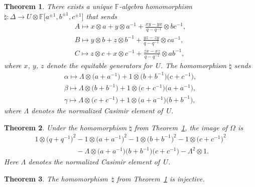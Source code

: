 \documentclass[pdftex]{sigma}
\numberwithin{equation}{section}
\newtheorem{Theorem}{Theorem}[section]
\begin{document}
\begin{Theorem}\label{thm:main}
There exists a unique  $\mathbb F$-algebra homomorphism
$\natural: \Delta \to
U \otimes
\mathbb F \lbrack a^{\pm 1}, b^{\pm 1}, c^{\pm 1}\rbrack
$ that sends
\begin{gather*}
A  \mapsto   x \otimes a + y \otimes a^{-1} +
\frac{x y - y x}{q-q^{-1}} \otimes b c^{-1},
\\
B \mapsto  y \otimes b + z \otimes b^{-1} +
\frac{y z - z y}{q-q^{-1}} \otimes c a^{-1},
\\
C \mapsto  z \otimes c + x \otimes c^{-1} +
\frac{z x - x z}{q-q^{-1}} \otimes a b^{-1},
\end{gather*}
where $x$, $y$, $z$ denote the equitable generators for~$U$.
The homomorphism $\natural$ sends
\begin{gather}
\alpha  \mapsto  \Lambda \otimes \big(a+a^{-1}\big) + 1\otimes \big(b+b^{-1}\big)\big(c+c^{-1}\big),
\label{eq:alsend}
\\
\beta  \mapsto  \Lambda \otimes \big(b+b^{-1}\big) + 1 \otimes \big(c+c^{-1}\big)\big(a+a^{-1}\big),
\label{eq:besend}
\\
\gamma  \mapsto  \Lambda \otimes \big(c+c^{-1}\big) + 1 \otimes \big(a+a^{-1}\big)\big(b+b^{-1}\big),
\label{eq:gasend}
\end{gather}
where $\Lambda $ denotes the normalized Casimir element of~$U$.
\end{Theorem}


\begin{Theorem}\label{thm:main2}
Under the homomorphism
$\natural$
from Theorem~{\rm \ref{thm:main}}, the image of
$\Omega$ is
\begin{gather}
1 \otimes \big(q+q^{-1}\big)^2
-
1\otimes \big(a+a^{-1}\big)^2
-
1\otimes \big(b+b^{-1}\big)^2
-
1 \otimes \big(c+c^{-1}\big)^2
\nonumber\\
\phantom{1 \otimes \big(q+q^{-1}\big)^2}{}
-\Lambda \otimes \big(a+a^{-1}\big)\big(b+b^{-1}\big)\big(c+c^{-1}\big)
- \Lambda ^2 \otimes 1.\label{eq:omimage}
\end{gather}
Here $\Lambda$ denotes the normalized Casimir element
of~$U$.
\end{Theorem}

\begin{Theorem}
\label{thm:main3}
The
homomorphism~$\natural$
from Theorem~{\rm \ref{thm:main}} is injective.
\end{Theorem}
\end{document}
